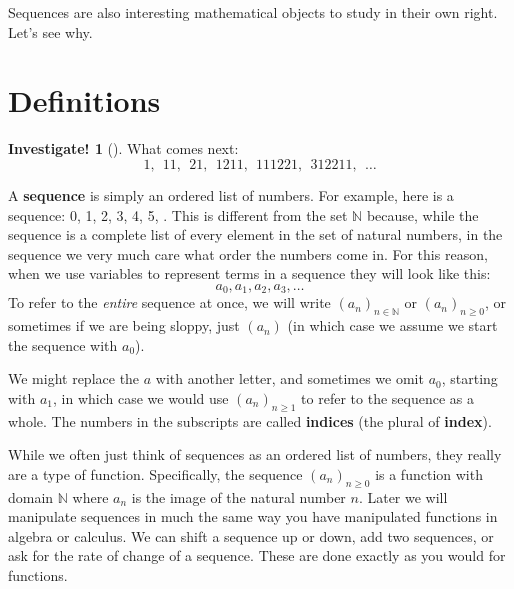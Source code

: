 \documentclass[10pt,]{book}
\newcommand{\terminology}[1]{\textbf{#1}}
\theoremstyle{plain}
\theoremstyle{definition}
\theoremstyle{definition}
\theoremstyle{definition}
\newtheorem{investigation}[project]{Investigate!}
\theoremstyle{definition}
\numberwithin{equation}{chapter}
\newcommand{\N}{\mathbb N}
\begin{document}
\par
\hypertarget{p-25}{}%
Sequences are also interesting mathematical objects to study in their own right. Let's see why.%
\typeout{************************************************}
\typeout{************************************************}
\section[{Definitions}]{Definitions}\label{sec_seq_intro}
\begin{investigation}[]\label{investigation-2}
\hypertarget{p-26}{}%
What comes next:%
\begin{equation*}
1, ~~11, ~~21, ~~1211, ~~111221, ~~312211, ~~\ldots
\end{equation*}
%
\end{investigation}
\hypertarget{p-27}{}%
A \terminology{sequence} is simply an ordered list of numbers. For example, here is a sequence: 0, 1, 2, 3, 4, 5, \textellipsis{}. This is different from the set \(\N\) because, while the sequence is a complete list of every element in the set of natural numbers, in the sequence we very much care what order the numbers come in. For this reason, when we use variables to represent terms in a sequence they will look like this:%
\begin{equation*}
a_0, a_1, a_2, a_3, \ldots
\end{equation*}
To refer to the \emph{entire} sequence at once, we will write \((a_n)_{n\in\N}\) or \((a_n)_{n\ge 0}\), or sometimes if we are being sloppy, just \((a_n)\) (in which case we assume we start the sequence with \(a_0\)). \label{notation-1}
%
\par
\hypertarget{p-28}{}%
We might replace the \(a\) with another letter, and sometimes we omit \(a_0\), starting with \(a_1\), in which case we would use \((a_n)_{n \ge 1}\) to refer to the sequence as a whole. The numbers in the subscripts are called \terminology{indices} (the plural of \terminology{index}).%
\par
\hypertarget{p-29}{}%
While we often just think of sequences as an ordered list of numbers, they really are a type of function. Specifically, the sequence \((a_n)_{n\ge 0}\) is a function with domain \(\N\) where \(a_n\) is the image of the natural number \(n\). Later we will manipulate sequences in much the same way you have manipulated functions in algebra or calculus. We can shift a sequence up or down, add two sequences, or ask for the rate of change of a sequence. These are done exactly as you would for functions.%
\end{document}
